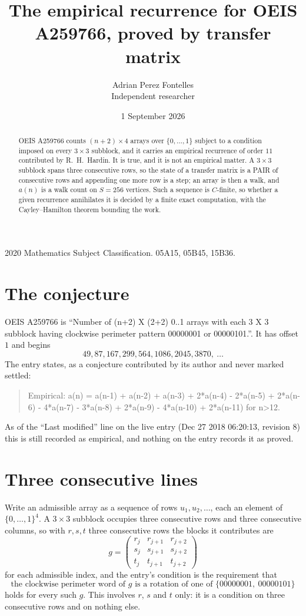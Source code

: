 \documentclass[11pt,a4paper]{article}
\title{The empirical recurrence for OEIS A259766, proved by transfer matrix}
\author{Adrian Perez Fontelles\\ \small Independent researcher}
\date{1 September 2026}
\theoremstyle{plain}
\theoremstyle{definition}
\begin{document}
\maketitle

\begin{abstract}
OEIS A259766 counts $(n+2)\times4$ arrays over $\{0,\dots,1\}$ subject to a condition imposed on
every $3\times3$ subblock, and it carries an empirical recurrence of order $11$
contributed by R.~H.~Hardin. It is true, and it is not an empirical matter. A $3\times3$
subblock spans three consecutive rows, so the state of a transfer matrix is a PAIR of
consecutive rows and appending one more row is a step; an array is then a walk, and
$a(n)$ is a walk count on $S=256$ vertices. Such a sequence is $C$-finite, so whether a given
recurrence annihilates it is decided by a finite exact computation, with the Cayley--Hamilton
theorem bounding the work.
\end{abstract}

\noindent\small 2020 Mathematics Subject Classification. 05A15, 05B45, 15B36.\normalsize

\section{The conjecture}

OEIS A259766 is ``Number of (n+2) X (2+2) 0..1 arrays with each 3 X 3 subblock having clockwise perimeter pattern 00000001 or 00000101.''. It has offset $1$ and begins
\[
49, 87, 167, 299, 564, 1086, 2045, 3870,\ \dots
\]
The entry states, as a conjecture contributed by its author and never marked settled:
\begin{quote}
Empirical: a(n) = a(n-1) + a(n-2) + a(n-3) + 2*a(n-4) - 2*a(n-5) + 2*a(n-6) - 4*a(n-7) - 3*a(n-8) + 2*a(n-9) - 4*a(n-10) + 2*a(n-11) for n>12.
\end{quote}
As of the ``Last modified'' line on the live entry (Dec 27 2018 06:20:13, revision 8) this is still
recorded as empirical, and nothing on the entry records it as proved.

\section{Three consecutive lines}

Write an admissible array as a sequence of rows $u_1,u_2,\dots$, each an element of
$\{0,\dots,1\}^{4}$. A $3\times3$ subblock occupies three consecutive rows and
three consecutive columns, so with $r,s,t$ three consecutive rows the blocks it
contributes are
\[
g=\begin{pmatrix}r_j&r_{j+1}&r_{j+2}\\ s_j&s_{j+1}&s_{j+2}\\ t_j&t_{j+1}&t_{j+2}\end{pmatrix}
\]
for each admissible index, and the entry's condition is the requirement that
\[
\text{the clockwise perimeter word of }g\text{ is a rotation of one of }\{00000001,\ 00000101\}
\]
holds for every such $g$. This involves $r$, $s$ and $t$ only: it is a condition on
three consecutive rows and on nothing else.
\end{document}
